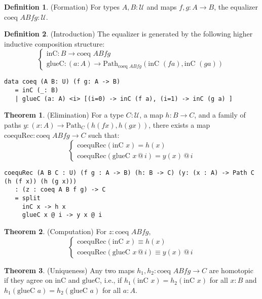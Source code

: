 \documentclass{article}
\theoremstyle{definition}
\newtheorem{theorem}{Theorem}
\newtheorem{definition}{Definition}
\begin{document}
\begin{definition} (Formation)
For types $A, B : \mathcal{U}$ and maps $f, g : A \to B$,
the equalizer $\text{coeq } A B f g : \mathcal{U}$.
\end{definition}

\begin{definition} (Introduction)
The equalizer is generated by the following higher
inductive composition structure:
\[
\begin{cases}
\text{inC} : B \to \text{coeq } A B f g \\
\text{glueC} : (a : A) \to \text{Path}_{\text{coeq } A B f g} (\text{inC } (f a), \text{inC } (g a))
\end{cases}
\]
\begin{lstlisting}
data coeq (A B: U) (f g: A -> B)
   = inC (_: B)
   | glueC (a: A) <i> [(i=0) -> inC (f a), (i=1) -> inC (g a) ]
\end{lstlisting}
\end{definition}

\begin{theorem} (Elimination)
For a type $C : \mathcal{U}$, a map $h : B \to C$, and a family of paths $y : (x : A) \to \text{Path}_C (h (f x), h (g x))$, there exists a map $\text{coequRec} : \text{coeq } A B f g \to C$ such that:
\[
\begin{cases}
\text{coequRec}(\text{inC } x) = h(x) \\
\text{coequRec}(\text{glueC } x \, @ \, i) = y(x) \, @ \, i
\end{cases}
\]
\begin{lstlisting}
coequRec (A B C : U) (f g : A -> B) (h: B -> C) (y: (x : A) -> Path C (h (f x)) (h (g x)))
   : (z : coeq A B f g) -> C
   = split
     inC x -> h x
     glueC x @ i -> y x @ i
\end{lstlisting}
\end{theorem}

\begin{theorem} (Computation)
For $z : \text{coeq } A B f g$,
\[
\begin{cases}
\text{coequRec}(\text{inC } x) \equiv h(x) \\
\text{coequRec}(\text{glueC } x \, @ \, i) \equiv y(x) \, @ \, i
\end{cases}
\]
\end{theorem}

\begin{theorem} (Uniqueness)
Any two maps $h_1, h_2 : \text{coeq } A B f g \to C$ are homotopic
if they agree on $\text{inC}$ and $\text{glueC}$, i.e.,
if $h_1(\text{inC } x) = h_2(\text{inC } x)$ for
all $x : B$ and $h_1(\text{glueC } a) = h_2(\text{glueC } a)$ for all $a : A$.
\end{theorem}
\end{document}
